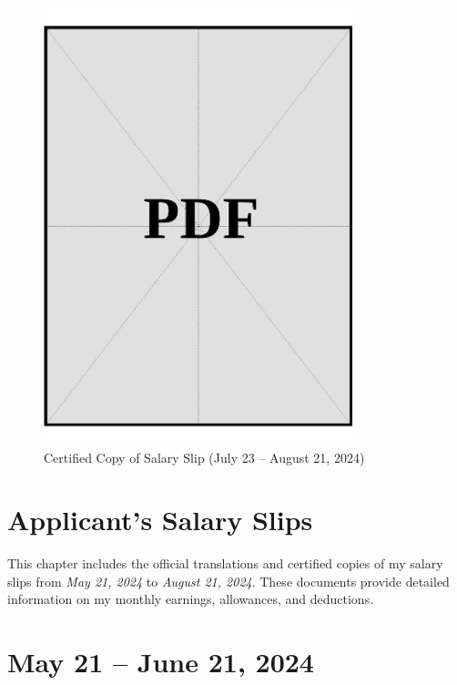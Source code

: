 \begin{figure}[h]
    \centering
    \includegraphics[page=1, width=0.8\textwidth]{../docs/sponsor/funds/salary-slips/month-3/certified-copies.pdf}
    \caption{Certified Copy of Salary Slip (July 23 – August 21, 2024)}
    \label{fig:month-3-certified}
\end{figure}

\vspace*{\fill}
\clearpage



\section{Applicant's Salary Slips}\label{sec:applicant-salary-slips}
\noindent
This chapter includes the official translations and certified copies of my salary slips from \textit{May 21, 2024} to \textit{August 21, 2024}. These documents provide detailed information on my monthly earnings, allowances, and deductions.

\clearpage

\section*{May 21 – June 21, 2024}

